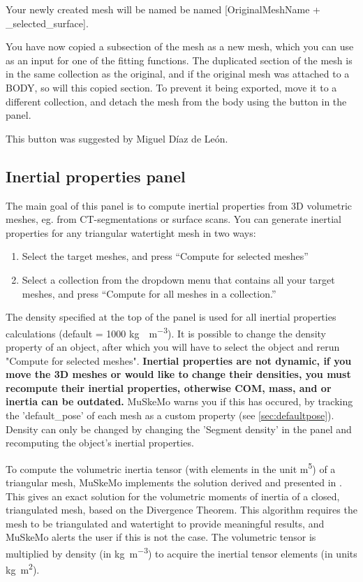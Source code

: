 \documentclass{article}
\begin{document}
Your newly created mesh will be named be named [OriginalMeshName + \_selected\_surface].

You have now copied a subsection of the mesh as a new mesh, which you can use as an input for one of the fitting functions. The duplicated section of the mesh is in the same collection as the original, and if the original mesh was attached to a BODY, so will this copied section. To prevent it being exported, move it to a different collection, and detach the mesh from the body using the button in the panel.

This button was suggested by Miguel Díaz de León.

\subsection{Inertial properties panel}
\label{sec:inproppanel}

The main goal of this panel is to compute inertial properties from 3D volumetric meshes, eg. from CT-segmentations or surface scans. You can generate inertial properties for any triangular watertight mesh in two ways:

\begin{enumerate}
\item Select the target meshes, and press ``Compute for selected meshes''
\item Select a collection from the dropdown menu that contains all your target meshes, and press ``Compute for all meshes in a collection.''
\end{enumerate}

The density specified at the top of the panel is used for all inertial properties calculations (default = 1000 \unit{kg \cdot m^{-3}}). It is possible to change the density property of an object, after which you will have to select the object and rerun "Compute for selected meshes". 
\textbf{Inertial properties are not dynamic, if you move the 3D meshes or would like to change their densities, you must recompute their inertial properties, otherwise COM, mass, and or inertia can be outdated.} MuSkeMo warns you if this has occured, by tracking the 'default\_pose' of each mesh as a custom property (see \ref{sec:defaultpose}). Density can only be changed by changing the 'Segment density' in the panel and recomputing the object's inertial properties.

To compute the volumetric inertia tensor (with elements in the unit \si{m^5}) of a triangular mesh, MuSkeMo implements the solution derived and presented in \cite{eberlyGamePhysics2004}. This gives an exact solution for the volumetric moments of inertia of a closed, triangulated mesh, based on the Divergence Theorem. This algorithm requires the mesh to be triangulated and watertight to provide meaningful results, and MuSkeMo alerts the user if this is not the case. The volumetric tensor is multiplied by density (in \si{kg m^{-3}}) to acquire the inertial tensor elements (in units \si{kg m^2}). 
\end{document}
